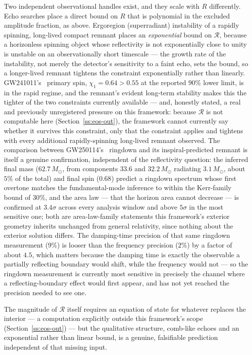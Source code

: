 \documentclass[pdflatex,sn-mathphys-num]{sn-jnl}
\theoremstyle{thmstyleone}
\theoremstyle{thmstylethree}
\theoremstyle{thmstyletwo}
\begin{document}
Two independent observational handles exist, and they scale with $R$
differently. Echo searches place a direct bound on $R$ that is
polynomial in the excluded amplitude fraction, as above. Ergoregion
(superradiant) instability of a rapidly spinning, long-lived compact
remnant places an \emph{exponential} bound on $\mathcal{R}$, because a
horizonless spinning object whose reflectivity is not exponentially
close to unity is unstable on an observationally short timescale — the
growth rate of the instability, not merely the detector's sensitivity to
a faint echo, sets the bound, so a longer-lived remnant tightens the
constraint exponentially rather than linearly. GW241011's~\cite{GW241011}
primary spin, $\chi_1=0.64>0.55$ at the reported $90\%$ lower limit, is in the rapid
regime, and the remnant's evident long-term stability makes this the
tighter of the two constraints currently available — and, honestly
stated, a real and previously unregistered pressure on this framework:
because $\mathcal{R}$ is not computable here (Section~\ref{ss:eos-out}),
the framework cannot currently say whether it survives this constraint,
only that the constraint applies and tightens with every additional
rapidly-spinning long-lived remnant observed. The comparison
between GW250114's~\cite{GW250114} ringdown and its inspiral-predicted remnant is itself
a genuine confirmation, independent of the reflectivity question: the
inferred final mass ($62.7\,M_\odot$, from components $33.6$ and
$32.2\,M_\odot$ radiating $3.1\,M_\odot$, about $5\%$ of the total) and
final spin ($0.68$) predict a ringdown spectrum whose first overtone
matches the fundamental-mode inference to within the Kerr-family bound
of $30\%$, and the area law — that the horizon area cannot decrease — is
confirmed at $3.4\sigma$ across every analysis window and above $5\sigma$
in the most sensitive one; both are area-law-family statements this
framework's exterior geometry inherits unchanged from general relativity,
since nothing about the exterior solution differs. The damping-time
precision of that same ringdown measurement ($9\%$) is looser than the
frequency precision ($2\%$) by a factor of about $4.5$, which matters because
the damping time is exactly the observable a partially reflecting
boundary would shift, while the frequency would not — so the ringdown
measurement is currently most sensitive in precisely the channel where a
reflecting-boundary effect would first appear, and has not yet reached
the precision needed to see one.

The magnitude of $\mathcal{R}$ itself requires an
equation of state for whatever replaces the interior — a computation
explicitly outside this framework's scope (Section~\ref{ss:eos-out}) —
but the qualitative structure, comb-like echoes and an exponential rather
than linear bound, is a genuine, falsifiable prediction independent of
that missing input.
\end{document}
